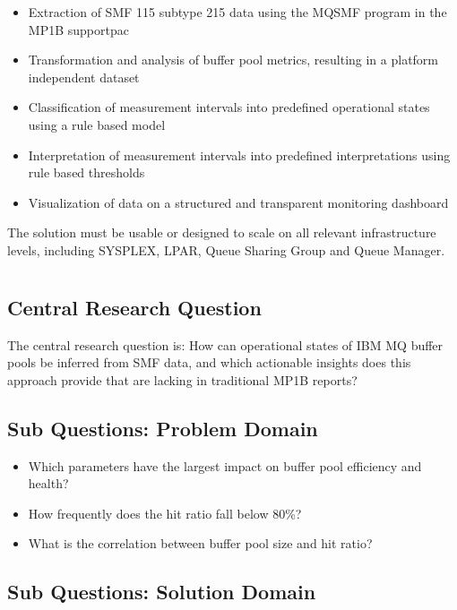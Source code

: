 \begin{itemize}
    \item Extraction of SMF 115 subtype 215 data using the MQSMF program in the MP1B supportpac 
    \item Transformation and analysis of buffer pool metrics, resulting in a platform independent dataset  
    \item Classification of measurement intervals into predefined operational states using a rule based model  
    \item Interpretation of measurement intervals into predefined interpretations using rule based thresholds
    \item Visualization of data on a structured and transparent monitoring dashboard  
\end{itemize}

The solution must be usable or designed to scale on all relevant infrastructure levels, including SYSPLEX, LPAR, Queue Sharing Group and Queue Manager.



\section{}%
\label{sec:onderzoeksvraag}

\subsection{Central Research Question}%
The central research question is: How can operational states of IBM MQ buffer pools be inferred from SMF data, and
which actionable insights does this approach provide that are lacking in traditional MP1B reports?

\subsection{Sub Questions: Problem Domain}%

\begin{itemize}
    \item Which parameters have the largest impact on buffer pool efficiency and health?
    \item How frequently does the hit ratio fall below 80\%?
    \item What is the correlation between buffer pool size and hit ratio?
\end{itemize}

\subsection{Sub Questions: Solution Domain}%

